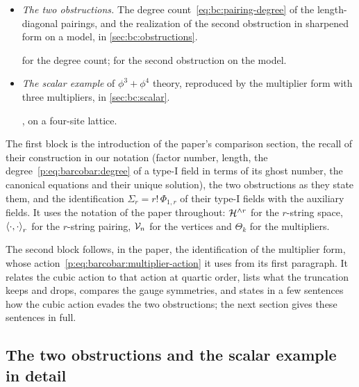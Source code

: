 \begin{itemize}
    , from a ghost-number saturation argument on the gauge laws of the auxiliary field; the model check corroborates it only weakly.

    The parameters that preserve the canonical form are the single-string ones, \eqref{p:eq:barcobar:canonical-parameters}.

    : their theorem, transcribed to the symmetric coalgebra and not re-derived.

  \item \emph{The two obstructions.} The degree count~\eqref{eq:bc:pairing-degree} of the length-diagonal pairings, and the realization of the second obstruction in sharpened form on a model, in \cref{sec:bc:obstructions}.

     for the degree count;  for the second obstruction on the model.

  \item \emph{The scalar example} of $\phi^3 + \phi^4$ theory, reproduced by the multiplier form with three multipliers, in \cref{sec:bc:scalar}.

    , on a four-site lattice.
\end{itemize}

The first block is the introduction of the paper's comparison section, the recall of their construction in our notation (factor number, length, the degree~\eqref{p:eq:barcobar:degree} of a type-I field in terms of its ghost number, the canonical equations and their unique solution), the two obstructions as they state them, and the identification $\Sigma_r = r! \, \Phi_{1, r}$ of their type-I fields with the auxiliary fields.
It uses the notation of the paper throughout: $\Hn{r}$ for the $r$-string space, $\pair[r]{\cdot}{\cdot}$ for the $r$-string pairing, $\vertex{n}$ for the vertices and $\Theta_k$ for the multipliers.



The second block follows, in the paper, the identification of the multiplier form, whose action~\eqref{p:eq:barcobar:multiplier-action} it uses from its first paragraph.
It relates the cubic action to that action at quartic order, lists what the truncation keeps and drops, compares the gauge symmetries, and states in a few sentences how the cubic action evades the two obstructions; the next section gives these sentences in full.



\subsection{The two obstructions and the scalar example in detail}
\label{sec:bc:detail}

